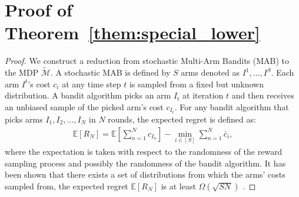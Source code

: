\documentclass{article}
\begin{document}
\section{Proof of Theorem~\ref{them:special_lower}}
\label{sec:special_lower}
\begin{proof}
We construct a reduction from stochastic Multi-Arm Bandits (MAB) to the MDP $\tilde{\mathcal{M}}$. A stochastic MAB is defined by $S$ arms denoted as $I^1, ..., I^S$. Each arm $I^t$'s cost $c_{i}$ at any time step $t$ is sampled from a fixed but unknown distribution. A bandit algorithm picks an arm $I_t$ at  iteration $t$ and then receives an unbiased sample of the picked arm's cost $c_{I_t}$. For any bandit algorithm that picks arms $I_1, I_2,...,I_N$ in $N$ rounds, the expected regret is defined as:
\begin{align}
\mathbb{E}[R_N] = \mathbb{E}[  \sum_{n=1}^N c_{I_n}] - \min_{i\in[S]}\sum_{n=1}^N \bar{c}_{i},
\end{align} where the expectation is taken with respect to the randomness of the reward sampling process and possibly the randomness of the bandit algorithm. It has been shown that there exists a set of distributions  from which the arms' costs sampled from, the expected regret $\mathbb{E}[R_N]$ is at least $\Omega(\sqrt{S N})$ \cite{bubeck2012regret}. 


\end{proof}
\end{document}
